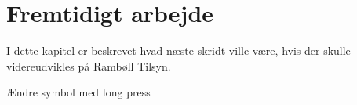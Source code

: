 \chapter{Fremtidigt arbejde}
I dette kapitel er beskrevet hvad næste skridt ville være, hvis der skulle videreudvikles på Rambøll Tilsyn.




Ændre symbol med long press